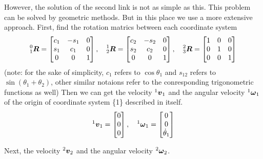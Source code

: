 \documentclass[a4paper]{article}
\begin{document}
However, the solution of the second link is not as simple as this. This problem can be solved by geometric methods. But in this place we use a more extensive approach. First, find the rotation matrics between each coordinate system
\begin{equation}
  \prescript{0}{1}{\boldsymbol {R}}   = 
\left [
\begin{matrix}
   c_1 & -s_1 & 0  \\
   s_1 & c_1 & 0 \\
   0 & 0 & 1 \\
\end{matrix}
\right ],\ \ \
\prescript{1}{2}{\boldsymbol {R}}   = 
\left [
\begin{matrix}
   c_2 & -s_2 & 0 \\
   s_2 & c_2 & 0 \\
   0 & 0 & 1  \\
\end{matrix}
\right ],\ \ \
\prescript{2}{3}{\boldsymbol {R}}  = 
\left [
\begin{matrix}
   1 & 0 & 0  \\
   0 & 1 & 0  \\
   0 & 0 & 1  \\
\end{matrix}
\right ]
\end{equation}
(note: for the sake of simplicity, $c_1$ refers to $\cos\theta_1$ and $s_{12}$ refers to $\sin(\theta_1+\theta_2)$, other similar notaions refer to the conresponding trigonometric functions as well)
Then we can get the velocity $\prescript{1}{}{\boldsymbol{v}}_1$ and the angular velocity $\prescript{1}{}{\boldsymbol{\omega}}_1$ of the origin of coordinate system \{1\} described in itself. 
\begin{equation}
\prescript{1}{}{\boldsymbol{v}}_1 = 
\left [
\begin{matrix}
   0  \\
   0 \\
   0  \\
\end{matrix}
\right ],\ \ \
\prescript{1}{}{\boldsymbol{\omega}}_1 = 
\left [
\begin{matrix}
   0  \\
   0 \\
   \dot\theta_1 \\
\end{matrix}
\right ]
\end{equation}

\noindent Next, the velocity $\prescript{2}{}{\boldsymbol{v}}_2$ and the angular velocity $\prescript{2}{}{\boldsymbol{\omega}}_2$.
\end{document}
